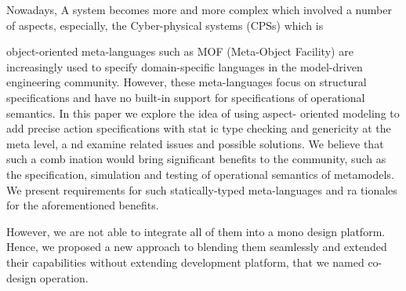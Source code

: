 Nowadays, A system becomes more and more complex which involved a number of aspects, especially, the Cyber-physical systems (CPSs) which is 


object-oriented  meta-languages such as MOF (Meta-Object Facility) are increasingly used to  specify domain-specific languages in  the   model-driven   engineering   community.   However,   these   meta-languages focus on structural specifications and have no built-in support for specifications 
of  operational  semantics.  In  this  paper  
we  explore  the  idea  of  using  aspect-
oriented modeling to add precise action specifications with stat
ic type checking 
and  genericity  at  the  meta  level,  a
nd  examine  related  issues  and  possible  
solutions. We believe that such a comb
ination would bring significant benefits 
to   the   community,   such   as   the   specification,   simulation   and   testing   of   
operational   semantics   of   
metamodels.   We   present   requirements   for   such   
statically-typed meta-languages and ra
tionales for the aforementioned benefits. 





However, we are not able to integrate all of them into a mono design platform. Hence, we proposed a new approach to blending them seamlessly and extended their capabilities without extending development platform, that we named co-design operation. 